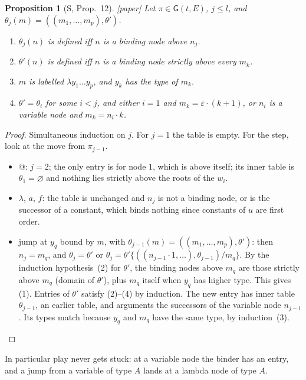 \documentclass[11pt]{article}
\newcommand{\Gm}{\mathsf{G}}
\newcommand{\suc}[2]{#1{\cdot}#2}
\newcommand{\Paper}{\textsf{[paper]}}
\theoremstyle{plain}
\newtheorem{proposition}[theorem]{Proposition}
\theoremstyle{definition}
\theoremstyle{remark}
\begin{document}
\begin{proposition}[S, Prop.~12]\label{prop:tables}
\Paper{} Let $\pi\in\Gm(t,E)$, $j\le l$, and
$\theta_j(m)=((m_1,\dots,m_p),\theta')$.
\begin{enumerate}
\item $\theta_j(n)$ is defined iff $n$ is a binding node above $n_j$.
\item $\theta'(n)$ is defined iff $n$ is a binding node strictly above
  every $m_k$.
\item $m$ is labelled $\lambda y_1\dots y_p$, and $y_k$ has the type of
  $m_k$.
\item $\theta'=\theta_i$ for some $i<j$, and either $i=1$ and
  $m_k=\suc{\varepsilon}{(k+1)}$, or $n_i$ is a variable node and
  $m_k=\suc{n_i}k$.
\end{enumerate}
\end{proposition}
\begin{proof}
Simultaneous induction on $j$.  For $j=1$ the table is empty.  For the
step, look at the move from $\pi_{j-1}$.
\begin{itemize}
\item $@$: $j=2$; the only entry is for node $1$, which is above itself;
  its inner table is $\theta_1=\varnothing$ and nothing lies strictly above
  the roots of the $w_i$.
\item $\lambda$, $a$, $f$: the table is unchanged and $n_j$ is not a
  binding node, or is the successor of a constant, which binds nothing
  since constants of $u$ are first order.
\item jump at $y_q$ bound by $m$, with
  $\theta_{j-1}(m)=((m_1,\dots,m_p),\theta')$: then $n_j=m_q$, and
  $\theta_j=\theta'$ or
  $\theta_j=\theta'\{((\suc{n_{j-1}}1,\dots),\theta_{j-1})/m_q\}$.  By the
  induction hypothesis~(2) for $\theta'$, the binding nodes above $m_q$
  are those strictly above $m_q$ (domain of $\theta'$), plus $m_q$
  itself when $y_q$ has higher type.  This gives (1).  Entries of
  $\theta'$ satisfy (2)--(4) by induction.  The new entry has inner
  table $\theta_{j-1}$, an earlier table, and arguments the successors
  of the variable node $n_{j-1}$.  Its types match because $y_q$ and
  $m_q$ have the same type, by induction~(3).  \qedhere
\end{itemize}
\end{proof}

In particular play never gets stuck: at a variable node the binder has
an entry, and a jump from a variable of type $A$ lands at a lambda node
of type $A$.
\end{document}
